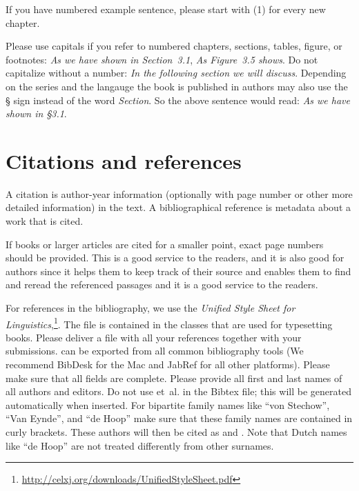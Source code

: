 If you have numbered example sentence, please start with (1) for every new chapter.

Please use capitals if you refer to numbered chapters, sections, tables, figure, or footnotes: \emph{As we have shown in
  Section~3.1}, \emph{As Figure~3.5 shows}. Do not capitalize without a number: \emph{In the
  following section we will discuss}.
Depending on the series and the langauge the book is published in authors may also use the § sign
instead of the word \emph{Section}. So the above sentence would read: \emph{As we have shown in
  §3.1}.

\section{Citations and references}
\label{sec-references-authors}

A citation is author-year information (optionally with page number or other more detailed information) in the text. A bibliographical reference is metadata about a work that is cited.

If books or larger articles are cited for a smaller point, exact page numbers should be provided. This is a good service to the readers, and it is also good for
authors since it helps them to keep track of their source and enables them to find and reread the
referenced passages and it is a good service to the readers.

For references in the bibliography, we use the \emph{Unified Style Sheet for Linguistics},\footnote{\url{http://celxj.org/downloads/UnifiedStyleSheet.pdf}}. The \bibtex file is contained in the \latex
classes that are used for typesetting \lsp books. 
Please deliver a \bibtex file with all your references together with your submissions. 
\bibtex can be exported from all common bibliography tools (We recommend BibDesk for the Mac and JabRef for all other platforms). 
Please make sure that all \bibtex fields are complete. %
Please provide all first and last names of all authors and editors. Do not use et~al. in the Bibtex file; this will be generated automatically when inserted.
For bipartite family names like ``von Stechow'', ``Van Eynde'', and ``de Hoop'' make sure that these
family names are contained in curly brackets. These authors will then be cited as
\citet{VanEynde2006a} and \citet{vonStechow84a}. Note that Dutch names like ``de Hoop'' are not treated differently from other surnames.

